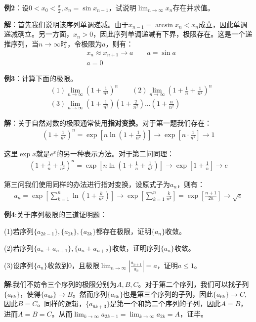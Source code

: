 \documentclass{ctexart}
\let\oldtextbf\textbf %
\renewcommand{\textbf}[1]{\textcolor{btex}{\oldtextbf{#1}}} %
\begin{document}
\textbf{\color{btex}例2}：设$0<x_0<\frac{\pi}{2},x_n=\sin x_{n-1}$，试说明$\lim_{n\to\infty}x_n$存在并求值。

\textbf{\color{btex}解}：首先我们说明该序列单调递减。由于$x_{n-1}=\arcsin x_n<x_n$成立，因此单调递减确立。另一方面，$x_n>0$，因此序列单调递减有下界，极限存在。这是一个递推序列，当$n\to\infty$时，令极限为$a$，则有：
\begin{align*}
    &x_n\approx x_{n+1}\to a\qquad  a=\sin a\\
    &a=0
\end{align*}

\textbf{\color{btex}例3}：计算下面的极限。
\begin{align*}
    &(1)\lim_{n\to\infty}(1+\frac{1}{n^2})^n\qquad (2)\lim_{n\to\infty}(1+\frac{1}{n}+\frac{1}{n^2})^n\\
    &(3) \lim_{n\to\infty}(1+\frac{1}{n^2})(1+\frac{2}{n^2})...(1+\frac{n}{n^2})
\end{align*}

\textbf{\color{btex}解}：关于自然对数的极限通常使用\textbf{\color{btex}指对变换}。对于第一题我们存在：
\begin{align*}
    (1+\frac{1}{n^2})^n=\exp[n\ln(1+\frac{1}{n^2})]\to\exp [n\cdot\frac{1}{n^2}]\to 1 
\end{align*}

这里$\exp x$就是$e^x$的另一种表示方法。对于第二问同理：
\begin{align*}
    (1+\frac{1}{n}+\frac{1}{n^2})^n=\exp[n\ln(1+\frac{1}{n}+\frac{1}{n^2})]\to\exp[1+\frac{1}{n}]\to e
\end{align*}

第三问我们使用同样的办法进行指对变换，设原式子为$a_n$，则有：
\begin{align*}
    a_n=\exp\left[\sum_{k=1}^n \ln(1+\frac{k}{n^2})\right]\to \exp\left[\sum_{k=1}^n\frac{k}{n^2}\right]=\exp [\frac{n+1}{2n}]\to \sqrt{e}
\end{align*}

\textbf{\color{btex}例4}:关于序列极限的三道证明题：

(1)若序列$\{a_{2k-1}\},\{a_{2k}\},\{a_{3k}\}$都存在极限，证明$\{a_n\}$收敛。

(2)若序列$\{a_n+a_{n+1}\},\{a_n+a_{n+2}\}$收敛，证明序列$\{a_n\}$收敛。

(3)设序列$\{a_n\}$收敛到0，且极限$\lim_{n\to\infty}|\frac{a_{n+1}}{a_n}|=a$，证明$a\leq 1$。

\textbf{\color{btex}解}:我们不妨令三个序列的极限分别为$A,B,C$。对于第二个序列，我们可以找子列$\{a_{6k}\}$，使得$\{a_{6k}\}\to B$。然而序列$\{a_{6k}\}$也是第三个序列的子列，因此$\{a_{6k}\}\to C$,因此$B=C$。同样的逻辑，$\{a_{6k+3}\}$是第一个和第二个序列的子列，因此$A=B$，进而$A=B=C$。从而$\lim_{k\to\infty}a_{2k-1}=\lim_{k\to\infty}a_{2k}=A$，证毕。
\end{document}

